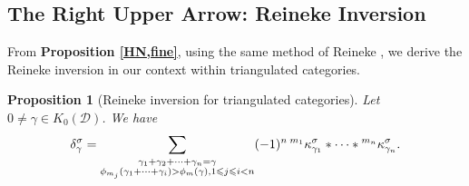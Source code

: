 \documentclass[a4paper,12pt]{amsart}
\newtheorem{proposition}[theorem]{Proposition}
\begin{document}
\subsection{The Right Upper Arrow: Reineke Inversion}
From \textbf{Proposition \ref{HN,fine}}, using the same method of Reineke \cite{Rei2002}, we derive the Reineke inversion in our context within triangulated categories.
\begin{proposition}[Reineke inversion for triangulated categories]\label{Reineke inversion}
    Let $0\neq\gamma\in K_0(\mathcal{D})$. We have
    \[\delta^\sigma_\gamma=\sum_{\begin{subarray}{c}
         \\  \gamma_1+\gamma_2+\dots+\gamma_n=\gamma\\{\phi_{m_j}}(\gamma_1+\dots+\gamma_i)>\phi_m(\gamma),1\leqslant j\leqslant i<n\\
    \end{subarray}}(-1)^n\,{^{m_1}}\kappa^\sigma_{\gamma_1}*\dots*{^{m_n}}\kappa^\sigma_{\gamma_n}.\]
\end{proposition}
\end{document}
